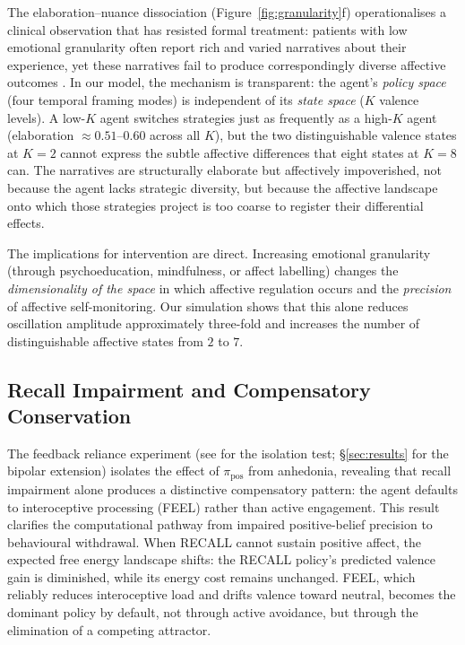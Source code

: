 \documentclass[11pt,a4paper]{article}
\begin{document}
The elaboration--nuance dissociation (Figure~\ref{fig:granularity}f) operationalises a clinical observation that has resisted formal treatment: patients with low emotional granularity often report rich and varied narratives about their experience, yet these narratives fail to produce correspondingly diverse affective outcomes \citep{barrett2017theory}. In our model, the mechanism is transparent: the agent's \emph{policy space} (four temporal framing modes) is independent of its \emph{state space} ($K$ valence levels). A low-$K$ agent switches strategies just as frequently as a high-$K$ agent (elaboration $\approx 0.51$--$0.60$ across all $K$), but the two distinguishable valence states at $K{=}2$ cannot express the subtle affective differences that eight states at $K{=}8$ can. The narratives are structurally elaborate but affectively impoverished, not because the agent lacks strategic diversity, but because the affective landscape onto which those strategies project is too coarse to register their differential effects.

The implications for intervention are direct. Increasing emotional granularity (through psychoeducation, mindfulness, or affect labelling) changes the \emph{dimensionality of the space} in which affective regulation occurs and the \emph{precision} of affective self-monitoring. Our simulation shows that this alone reduces oscillation amplitude approximately three-fold and increases the number of distinguishable affective states from $2$ to $7$.

\subsection{Recall Impairment and Compensatory Conservation}

The feedback reliance experiment (see \citealt{albarracin2026temporal} for the isolation test; \S\ref{sec:results} for the bipolar extension) isolates the effect of $\pi_{\text{pos}}$ from anhedonia, revealing that recall impairment alone produces a distinctive compensatory pattern: the agent defaults to interoceptive processing (FEEL) rather than active engagement. This result clarifies the computational pathway from impaired positive-belief precision to behavioural withdrawal. When RECALL cannot sustain positive affect, the expected free energy landscape shifts: the RECALL policy's predicted valence gain is diminished, while its energy cost remains unchanged. FEEL, which reliably reduces interoceptive load and drifts valence toward neutral, becomes the dominant policy by default, not through active avoidance, but through the elimination of a competing attractor.
\end{document}
